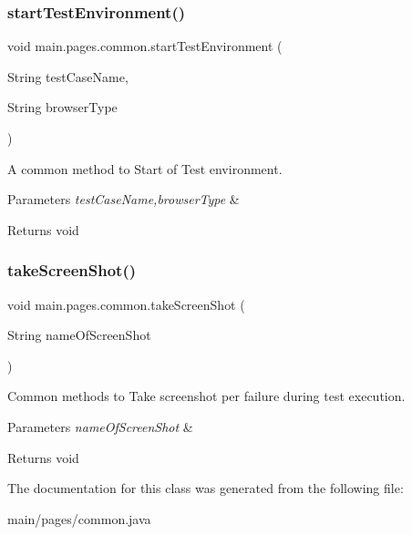 \subsubsection{\texorpdfstring{start\+Test\+Environment()}{startTestEnvironment()}}
{\footnotesize\ttfamily void main.\+pages.\+common.\+start\+Test\+Environment (\begin{DoxyParamCaption}\item[{String}]{test\+Case\+Name,  }\item[{String}]{browser\+Type }\end{DoxyParamCaption})}

A common method to Start of Test environment. 
\begin{DoxyParams}{Parameters}
{\em test\+Case\+Name,browser\+Type} & \\
\hline
\end{DoxyParams}
\begin{DoxyReturn}{Returns}
void 
\end{DoxyReturn}
\mbox{\label{classmain_1_1pages_1_1common_a7b9ae10e9d8cfb4504c06dc25d133c1f}} 
\subsubsection{\texorpdfstring{take\+Screen\+Shot()}{takeScreenShot()}}
{\footnotesize\ttfamily void main.\+pages.\+common.\+take\+Screen\+Shot (\begin{DoxyParamCaption}\item[{String}]{name\+Of\+Screen\+Shot }\end{DoxyParamCaption})}

Common methods to Take screenshot per failure during test execution. 
\begin{DoxyParams}{Parameters}
{\em name\+Of\+Screen\+Shot} & \\
\hline
\end{DoxyParams}
\begin{DoxyReturn}{Returns}
void 
\end{DoxyReturn}


The documentation for this class was generated from the following file\+:\begin{DoxyCompactItemize}
\item 
main/pages/common.\+java\end{DoxyCompactItemize}
